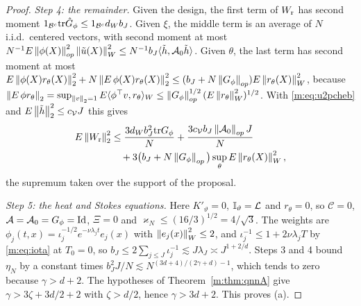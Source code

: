 \begin{proof}
\emph{Step 4: the remainder.} Given the design, the first term of $W_{\rm r}$ has second moment $1_{\mathcal B^c}\mathrm{tr}\hat G_\phi\le1_{\mathcal B^c}d_Wb_J$. Given $\xi$, the middle term is an average of $N$ i.i.d.\ centered vectors, with second moment at most $N^{-1}E\left\|\phi(X)\right\|^2_{op}\left\|\tilde u(X)\right\|^2_W\le N^{-1}b_J\langle\tilde h,\mathcal A_0\tilde h\rangle$. Given $\theta$, the last term has second moment at most $E\left\|\phi(X)r_\theta(X)\right\|^2_2+N\left\|E\,\phi(X)r_\theta(X)\right\|^2_2\le(b_J+N\left\|G_\phi\right\|_{op})E\left\|r_\theta(X)\right\|^2_W$, because $\left\|E\,\phi r_\theta\right\|_2=\sup_{\left\|v\right\|_2=1}E\langle\phi^\top v,r_\theta\rangle_W\le\left\|G_\phi\right\|^{1/2}_{op}(E\left\|r_\theta\right\|^2_W)^{1/2}$. With \eqref{m:eq:u2pcheb} and $E\left\|\tilde h\right\|^2_2\le c_{\mathcal V}J$ this gives
\[
\begin{aligned}
E\left\|W_{\rm r}\right\|^2_2&\le\frac{3d_Wb_J^2\mathrm{tr} G_\phi}N+\frac{3c_{\mathcal V}b_J\left\|\mathcal A_0\right\|_{op}J}N\\
&\quad+3\big(b_J+N\left\|G_\phi\right\|_{op}\big)\sup_\theta E\left\|r_\theta(X)\right\|^2_W ,
\end{aligned}
\]
the supremum taken over the support of the proposal.

\emph{Step 5: the heat and Stokes equations.} Here $K'_\vartheta=0$, $\mathbb{I}_\vartheta=\mathcal{L}$ and $r_\theta=0$, so $\mathcal C=0$, $\mathcal A=\mathcal A_0=G_\phi=\operatorname{Id}$, $\Xi=0$ and $\varkappa_N\le(16/3)^{1/2}=4/\sqrt3$. The weights are $\phi_j(t,x)=\iota_j^{-1/2}e^{-\nu\lambda_jt}e_j(x)$ with $\left\|e_j(x)\right\|^2_W\le2$, and $\iota_j^{-1}\le1+2\nu\lambda_jT$ by \eqref{m:eq:iota} at $T_0=0$, so $b_J\le2\sum_{j\le J}\iota_j^{-1}\lesssim J\lambda_J\asymp J^{1+2/d}$. Steps 3 and 4 bound $\eta_N$ by a constant times $b_J^2J/N\lesssim N^{(3d+4)/(2\gamma+d)-1}$, which tends to zero because $\gamma>d+2$. The hypotheses of Theorem~\ref{m:thm:qnnA} give $\gamma>3\zeta+3d/2+2$ with $\zeta>d/2$, hence $\gamma>3d+2$. This proves (a).


\end{proof}
